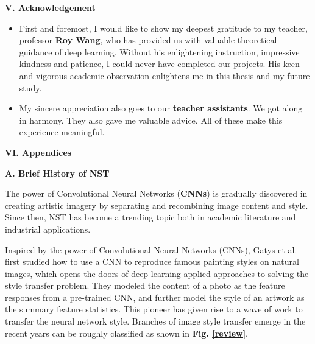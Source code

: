 \documentclass[a4paper]{article}
\begin{document}
\vspace{1cm}
\begin{center}
\LARGE\textbf{V. Acknowledgement} \\
\end{center}
\vspace{.5mm}

\begin{itemize} \item{First and foremost, I would like to show my deepest gratitude to my teacher, professor \textbf{Roy Wang}, who has provided us with valuable theoretical guidance of deep learning. Without his enlightening instruction, impressive kindness and patience, I could never have completed our projects. His keen and vigorous academic observation enlightens me in this thesis and my future study.}
\item{My sincere appreciation also goes to our \textbf{teacher assistants}. We got along in harmony. They also gave me valuable advice. All of these make this experience meaningful.}
\end{itemize}

\clearpage
\vspace{5mm}
\begin{center}
\LARGE\textbf{VI. Appendices} \\
\end{center}
\vspace{1mm}
\begin{center}
\large\textbf{A. Brief History of NST} \\
\end{center}
The power of Convolutional Neural Networks (\textbf{CNNs}) is gradually discovered in creating artistic imagery by separating and recombining image content and style. Since then, NST has become a trending topic both in academic literature and industrial applications.

Inspired by the power of Convolutional Neural Networks (CNNs), Gatys et al. first studied how to use a CNN to reproduce famous painting styles on natural images, which opens the doors of deep-learning applied approaches to solving the style transfer problem. They modeled the content of a photo as the feature responses from a pre-trained CNN, and further model the style of an artwork as the summary feature statistics. This pioneer has given rise to a wave of work to transfer the neural network style. Branches of image style transfer emerge in the recent years can be roughly classified as shown in \textbf{Fig. \ref{review}}.
\end{document}

